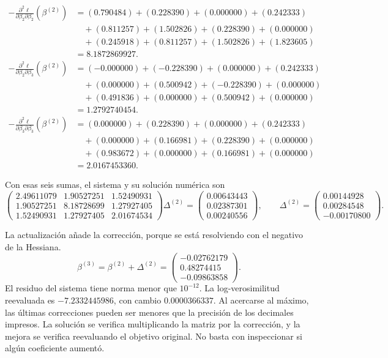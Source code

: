 \documentclass[11pt,a4paper]{article}
\begin{document}
\[
\begin{aligned}
-\frac{\partial^2\ell}{\partial\beta_2\partial\beta_2}(\beta^{(2)})&=(0.790484)+(0.228390)+(0.000000)+(0.242333)\\&\quad+(0.811257)+(1.502826)+(0.228390)+(0.000000)\\&\quad+(0.245918)+(0.811257)+(1.502826)+(1.823605)\\&=8.1872869927.\end{aligned}
\]
\[
\begin{aligned}
-\frac{\partial^2\ell}{\partial\beta_2\partial\beta_3}(\beta^{(2)})&=(-0.000000)+(-0.228390)+(0.000000)+(0.242333)\\&\quad+(0.000000)+(0.500942)+(-0.228390)+(0.000000)\\&\quad+(0.491836)+(0.000000)+(0.500942)+(0.000000)\\&=1.2792740454.\end{aligned}
\]
\[
\begin{aligned}
-\frac{\partial^2\ell}{\partial\beta_3\partial\beta_3}(\beta^{(2)})&=(0.000000)+(0.228390)+(0.000000)+(0.242333)\\&\quad+(0.000000)+(0.166981)+(0.228390)+(0.000000)\\&\quad+(0.983672)+(0.000000)+(0.166981)+(0.000000)\\&=2.0167453360.\end{aligned}
\]

Con esas seis sumas, el sistema y su solución numérica son
\[
\begin{pmatrix}2.49611079&1.90527251&1.52490931\\1.90527251&8.18728699&1.27927405\\1.52490931&1.27927405&2.01674534\end{pmatrix}\Delta^{(2)}=\begin{pmatrix}0.00643443\\0.02387301\\0.00240556\end{pmatrix},\qquad\Delta^{(2)}=\begin{pmatrix}0.00144928\\0.00284548\\-0.00170800\end{pmatrix}.
\]

La actualización añade la corrección, porque se está resolviendo
con el negativo de la Hessiana.
\[
\beta^{(3)}=\beta^{(2)}+\Delta^{(2)}=\begin{pmatrix}-0.02762179\\0.48274415\\-0.09863858\end{pmatrix}.
\]
El residuo del sistema tiene norma menor que \(10^{-12}\). La log-verosimilitud reevaluada es \(-7.2332445986\), con cambio \(0.0000366337\). 
Al acercarse al máximo, las últimas correcciones pueden ser
menores que la precisión de los decimales impresos.
La solución se verifica multiplicando la matriz por la corrección,
y la mejora se verifica reevaluando el objetivo original.
No basta con inspeccionar si algún coeficiente aumentó.
\endgroup
\end{document}

